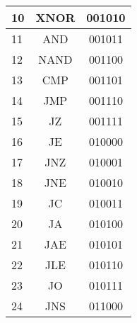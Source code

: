 \documentclass[conference]{IEEEtran}
\begin{document}
\begin{table}[h]
\begin{tabular}{|l|c|c|}
    10                                          & XNOR                              & 001010                                 \\ \hline
    11                                          & AND                               & 001011                                 \\ \hline
    12                                          & NAND                              & 001100                                 \\ \hline
    13                                          & CMP                               & 001101                                 \\ \hline
    14                                          & JMP                               & 001110                                 \\ \hline
    15                                          & JZ                                & 001111                                 \\ \hline
    16                                          & JE                                & 010000                                 \\ \hline
    17                                          & JNZ                               & 010001                                 \\ \hline
    18                                          & JNE                               & 010010                                 \\ \hline
    19                                          & JC                                & 010011                                 \\ \hline
    20                                          & JA                                & 010100                                 \\ \hline
    21                                          & JAE                               & 010101                                 \\ \hline
    22                                          & JLE                               & 010110                                 \\ \hline
    23                                          & JO                                & 010111                                 \\ \hline
    24                                          & JNS                               & 011000                                 \\ \hline

\end{tabular}
\end{table}
\end{document}

